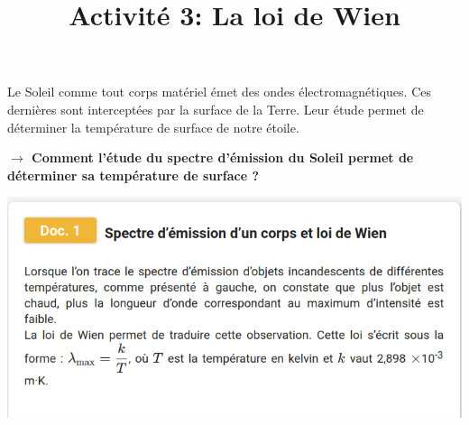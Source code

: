 \documentclass[10pt]{article}
\newcommand{\titreActivite}{Activité 3: La loi de Wien} %
\begin{document}
\date{}
\title{\titreActivite}
\maketitle %
\begin{center}
	Le Soleil comme tout corps matériel émet des ondes électromagnétiques. Ces dernières sont interceptées par la surface de la Terre. Leur étude permet de déterminer la température de surface de notre étoile.

	\textbf{$→$ Comment l’étude du spectre d’émission du Soleil permet de déterminer sa température de surface ?}


	\includegraphics[scale=0.45]{doc1/0.png}

\end{center}
\end{document}
